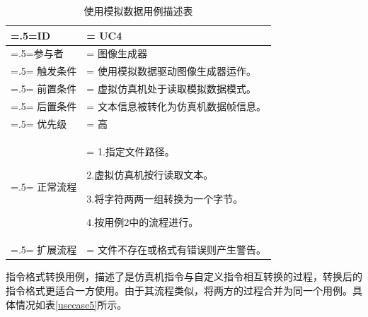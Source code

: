 \begin{table}[htbp]
    \begin{center}
        \caption{使用模拟数据用例描述表}
        \label{usecase4}
        \renewcommand\arraystretch{1.5}
        \begin{tabularx}{0.8\textwidth}{ 
            | >{\centering\arraybackslash\hsize=.5\hsize\linewidth=\hsize}X 
            | >{\raggedright\arraybackslash\hsize=1.5\hsize\linewidth=\hsize}X 
            | }
            \hline
            \textbf{ID} & \textbf{UC4}\\
            \hline
            参与者 & 图像生成器\\
            \hline
            触发条件 & 使用模拟数据驱动图像生成器运作。\\
            \hline
            前置条件 & 虚拟仿真机处于读取模拟数据模式。\\
            \hline
            后置条件 & 文本信息被转化为仿真机数据帧信息。\\
            \hline
            优先级 & 高\\
            \hline
            正常流程 & 1.指定文件路径。\par 2.虚拟仿真机按行读取文本。\par 3.将字符两两一组转换为一个字节。\par 4.按用例2中的流程进行。\\
            \hline
            扩展流程 & 文件不存在或格式有错误则产生警告。\\
            \hline
        \end{tabularx}
    \end{center}
\end{table}
\par
指令格式转换用例，描述了是仿真机指令与自定义指令相互转换的过程，转换后的指令格式更适合一方使用。由于其流程类似，将两方的过程合并为同一个用例。具体情况如表\ref{usecase5}所示。
